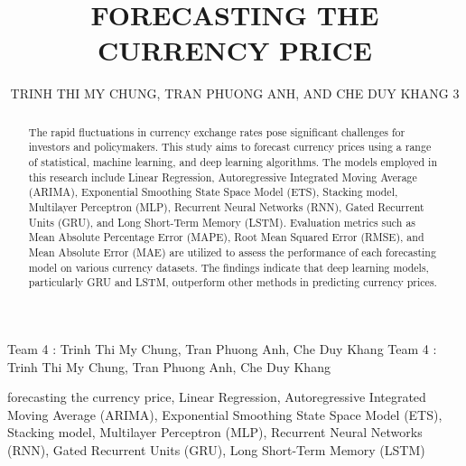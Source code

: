 \documentclass{ieeeojies}
\begin{document}
\title{FORECASTING THE CURRENCY PRICE}

\author{\uppercase{Trinh Thi My Chung},
\uppercase{Tran Phuong Anh, and Che Duy Khang 3}}

\address[1]{Faculty of Information Systems, University of Information Technology, (e-mail: 21520653@gm.uit.edu.vn)}
\address[2]{Faculty of Information Systems, University of Information Technology, (e-mail: 21520595@gm.uit.edu.vn)}
\address[3]{Faculty of Information Systems, University of Information Technology, (e-mail: 21522187@gm.uit.edu.vn)}

\markboth
{Team 4 \headeretal: Trinh Thi My Chung, Tran Phuong Anh, Che Duy Khang}
{Team 4 \headeretal: Trinh Thi My Chung, Tran Phuong Anh, Che Duy Khang}

\begin{abstract}

The rapid fluctuations in currency exchange rates pose significant challenges for investors and policymakers. This study aims to forecast currency prices using a range of statistical, machine learning, and deep learning algorithms. The models employed in this research include Linear Regression, Autoregressive Integrated Moving Average (ARIMA), Exponential Smoothing State Space Model (ETS), Stacking model, Multilayer Perceptron (MLP), Recurrent Neural Networks (RNN), Gated Recurrent Units (GRU), and Long Short-Term Memory (LSTM). Evaluation metrics such as Mean Absolute Percentage Error (MAPE), Root Mean Squared Error (RMSE), and Mean Absolute Error (MAE) are utilized to assess the performance of each forecasting model on various currency datasets. The findings indicate that deep learning models, particularly GRU and LSTM, outperform other methods in predicting currency prices.
\end{abstract}

\begin{keywords}

forecasting the currency price, Linear Regression, Autoregressive Integrated Moving Average (ARIMA), Exponential Smoothing State Space Model (ETS), Stacking model, Multilayer Perceptron (MLP), Recurrent Neural Networks (RNN), Gated Recurrent Units (GRU), Long Short-Term Memory (LSTM)
\end{keywords}

\titlepgskip=-15pt

\maketitle
\end{document}
